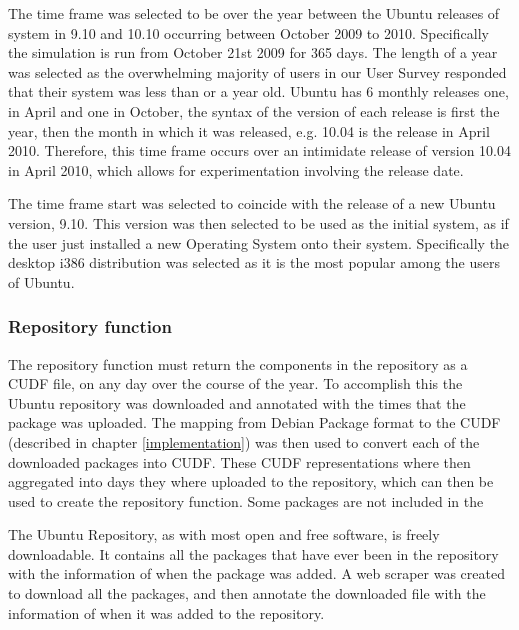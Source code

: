 The time frame was selected to be over the year between the Ubuntu releases of system in 9.10 and 10.10 occurring between October 2009 to 2010.
Specifically the simulation is run from October 21st 2009 for 365 days.
The length of a year was selected as the overwhelming majority of users in our User Survey responded that their system was less than or a year old.
Ubuntu has 6 monthly releases one, in April and one in October, the syntax of the version of each release is first the year,
then the month in which it was released, e.g. 10.04 is the release in April 2010.
Therefore, this time frame occurs over an intimidate release of version 10.04 in April 2010, which allows for experimentation involving the release date.

The time frame start was selected to coincide with the release of a new Ubuntu version, 9.10.
This version was then selected to be used as the initial system, as if the user just installed a new Operating System onto their system.
Specifically the desktop i386 distribution was selected as it is the most popular among the users of Ubuntu.

\subsubsection{Repository function}
The repository function must return the components in the repository as a CUDF file, on any day over the course of the year.
To accomplish this the Ubuntu repository was downloaded and annotated with the times that the package was uploaded.
The mapping from Debian Package format to the CUDF (described in chapter \ref{implementation}) was then used to convert each of the downloaded packages into CUDF.
These CUDF representations where then aggregated into days they where uploaded to the repository, which can then be used to create the repository function.
Some packages are not included in the 

The Ubuntu Repository, as with most open and free software, is freely downloadable.
It contains all the packages that have ever been in the repository with the information of when the package was added.
A web scraper was created to download all the packages, and then annotate the downloaded file with the information of when it was added to the repository.

